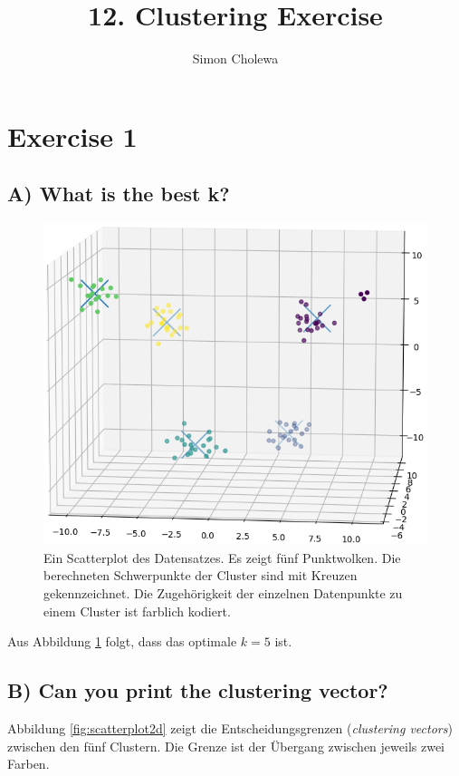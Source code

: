 \documentclass[11pt,a4paper]{article}
\author{Simon Cholewa}
\title{12. Clustering Exercise}
\begin{document}
\maketitle

\section*{Exercise 1}

\subsection*{A) What is the best k?}
\begin{figure}[h!]
	\centering
	\includegraphics[width=0.9\linewidth]{Figure_3}
	\caption{Ein Scatterplot des Datensatzes. Es zeigt fünf Punktwolken. Die berechneten Schwerpunkte der Cluster sind mit Kreuzen gekennzeichnet. Die Zugehörigkeit der einzelnen Datenpunkte zu einem Cluster ist farblich kodiert.}
	\label{fig:scatterplot}
\end{figure}

Aus Abbildung \ref{fig:scatterplot} folgt, dass das optimale $k=5$ ist.


\subsection*{B) Can you print the clustering vector?}

Abbildung \ref{fig:scatterplot2d} zeigt die Entscheidungsgrenzen (\textit{clustering vectors}) zwischen den fünf Clustern. Die Grenze ist der Übergang zwischen jeweils zwei Farben.
\end{document}
